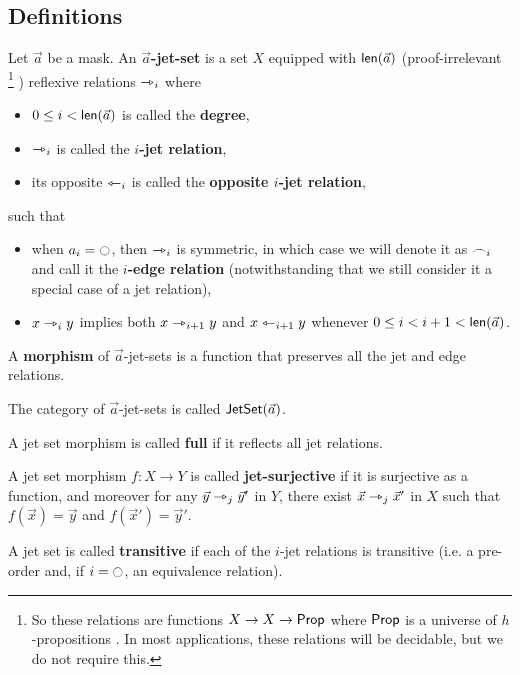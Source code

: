 \documentclass[a4paper]{memoir}
\begin{document}
\subsection{Definitions} \label{sec:jetset:def}
\begin{definition} \label{def:jetset}
	Let $\vec a$ be a mask. An \textbf{$\vec a$-jet-set} is a set $X$ equipped with $\mathsf{len}(\vec a)$ (proof-irrelevant%
	\footnote{So these relations are functions $X \to X \to {\mathsf{Prop}}$ where ${\mathsf{Prop}}$ is a universe of $h$-propositions \cite{hottbook}. In most applications, these relations will be decidable, but we do not require this.}%
	) reflexive relations $\rightarrowtriangle_i$ where
	\begin{itemize}
		\item $0 \leq i < \mathsf{len}(\vec a)$ is called the \textbf{degree},
		\item $\rightarrowtriangle_i$ is called the \textbf{$i$-jet relation},
		\item its opposite $\leftarrowtriangle_i$ is called the \textbf{opposite $i$-jet relation},
	\end{itemize}
	such that
	\begin{itemize}
		\item when $a_i = \npolar$, then $\rightarrowtriangle_i$ is symmetric, in which case we will denote it as $\frown_i$ and call it the \textbf{$i$-edge relation} (notwithstanding that we still consider it a special case of a jet relation),
		\item $x \rightarrowtriangle_i y$ implies both $x \rightarrowtriangle_{i+1} y$ and $x \leftarrowtriangle_{i+1} y$ whenever $0 \leq i < i+1 < \mathsf{len}(\vec a)$.
	\end{itemize}
	A \textbf{morphism} of $\vec a$-jet-sets is a function that preserves all the jet and edge relations.
	
	The category of $\vec a$-jet-sets is called $\mathsf{JetSet}(\vec a)$.
\end{definition}
\begin{definition} \label{def:full-jetsethom}
	A jet set morphism is called \textbf{full} if it reflects all jet relations.
\end{definition}
\begin{definition} \label{def:jet-surjective}
	A jet set morphism $f : X \to Y$ is called \textbf{jet-surjective} if it is surjective as a function, and moreover for any $\vec y \rightarrowtriangle_j \vec y'$ in $Y$, there exist $\vec x \rightarrowtriangle_j \vec x'$ in $X$ such that $f(\vec x) = \vec y$ and $f(\vec x') = \vec y'$. 
\end{definition}
\begin{definition} \label{def:transitive-jetset}
	A jet set is called \textbf{transitive} if each of the $i$-jet relations is transitive (i.e. a pre-order and, if $i = \npolar$, an equivalence relation).
\end{definition}
\end{document}
